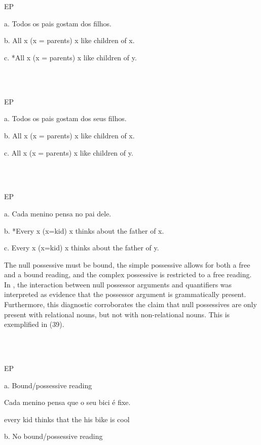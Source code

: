 \documentclass[output=paper]{langsci/langscibook}
\begin{document}
\ea%
    \label{ex:key:36}
    \gll\\
        \\
    \glt
    \z

          EP

  a.  Todos os pais gostam dos filhos.

b.  All x (x = parents) x like children of x.

c.  *All x (x = parents) x like children of y.

\ea%
    \label{ex:key:37}
    \gll\\
        \\
    \glt
    \z

          EP

  a.  Todos os pais gostam dos seus filhos.

b.  All x (x = parents) x like children of x.

c.  All x (x = parents) x like children of y.

\ea%
    \label{ex:key:38}
    \gll\\
        \\
    \glt
    \z

          EP

  a.  Cada menino pensa no pai dele.

b.  *Every x (x=kid) x thinks about the father of x.

c.  Every x (x=kid) x thinks about the father of y.

The null possessive must be bound, the simple possessive allows for both a free and a bound reading, and the complex possessive is restricted to a free reading. In \citet[1112]{Barker2011}, the interaction between null possessor arguments and quantifiers was interpreted as evidence that the possessor argument is grammatically present. Furthermore, this diagnostic corroborates the claim that null possessives are only present with relational nouns, but not with non-relational nouns. This is exemplified in (39).

\ea%
    \label{ex:key:39}
    \gll\\
        \\
    \glt
    \z

          EP

a.  Bound/possessive reading

Cada menino pensa que o seu bici é fixe.

every kid thinks that the his bike is cool

b.  No bound/possessive reading
\end{document}
